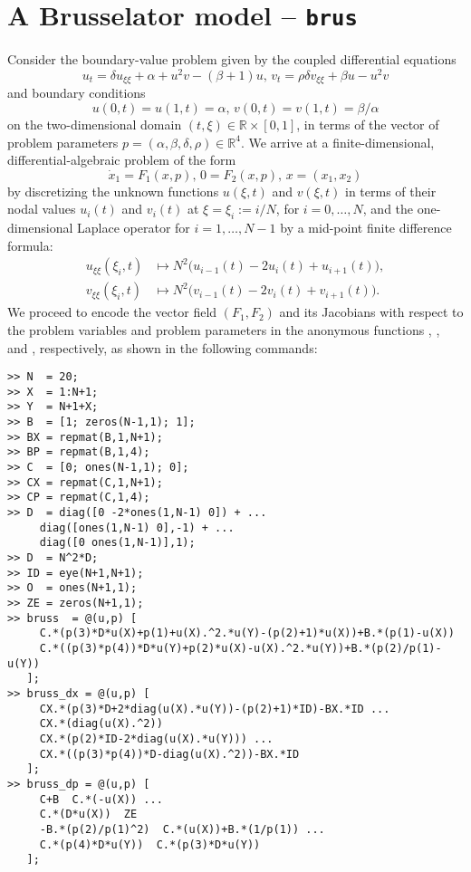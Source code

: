 \section{A Brusselator model -- \texttt{brus}}
Consider the boundary-value problem given by the coupled differential equations
\begin{equation}
u_t= \delta u_{\xi\xi} + \alpha + u^2v - (\beta + 1)u,\,
v_t= \rho\delta v_{\xi\xi} + \beta u - u^2v
\end{equation}
and boundary conditions
\begin{equation}
u(0,t)= u(1,t) = \alpha,\,v(0,t) = v(1,t) = \beta/\alpha
\end{equation}
on the two-dimensional domain $(t,\xi)\in\mathbb{R}\times[0,1]$, in terms of the vector of problem parameters $p=(\alpha,\beta,\delta,\rho)\in\mathbb{R}^4$. We arrive at a finite-dimensional, differential-algebraic problem of the form
\begin{equation}
\dot{x}_1=F_1(x,p),\,0=F_2(x,p),\,x=(x_1,x_2)
\end{equation}
by discretizing the unknown functions $u(\xi,t)$ and $v(\xi,t)$ in terms of their nodal values $u_i(t)$ and $v_i(t)$ at $\xi=\xi_i:=i/N$, for $i=0,\ldots,N$, and the one-dimensional Laplace operator for $i=1,\ldots,N-1$ by a mid-point finite difference formula:
\begin{align}
u_{\xi\xi}(\xi_i,t)&\mapsto N^2\big(u_{i-1}(t)-2u_i(t)+u_{i+1}(t)\big),\\
v_{\xi\xi}(\xi_i,t)&\mapsto N^2\big(v_{i-1}(t)-2v_i(t)+v_{i+1}(t)\big).
\end{align}
We proceed to encode the vector field $(F_1,F_2)$ and its Jacobians with respect to the problem variables and problem parameters in the anonymous functions , , and , respectively, as shown in the following commands:
\begin{lstlisting}[language=coco-highlight]
>> N  = 20;
>> X  = 1:N+1;
>> Y  = N+1+X;
>> B  = [1; zeros(N-1,1); 1];
>> BX = repmat(B,1,N+1);
>> BP = repmat(B,1,4);
>> C  = [0; ones(N-1,1); 0];
>> CX = repmat(C,1,N+1);
>> CP = repmat(C,1,4);
>> D  = diag([0 -2*ones(1,N-1) 0]) + ...
     diag([ones(1,N-1) 0],-1) + ...
     diag([0 ones(1,N-1)],1);
>> D  = N^2*D;
>> ID = eye(N+1,N+1);
>> O  = ones(N+1,1);
>> ZE = zeros(N+1,1);
>> bruss  = @(u,p) [
     C.*(p(3)*D*u(X)+p(1)+u(X).^2.*u(Y)-(p(2)+1)*u(X))+B.*(p(1)-u(X))
     C.*((p(3)*p(4))*D*u(Y)+p(2)*u(X)-u(X).^2.*u(Y))+B.*(p(2)/p(1)-u(Y))
   ];
>> bruss_dx = @(u,p) [
     CX.*(p(3)*D+2*diag(u(X).*u(Y))-(p(2)+1)*ID)-BX.*ID ...
     CX.*(diag(u(X).^2))
     CX.*(p(2)*ID-2*diag(u(X).*u(Y))) ...
     CX.*((p(3)*p(4))*D-diag(u(X).^2))-BX.*ID
   ];
>> bruss_dp = @(u,p) [
     C+B  C.*(-u(X)) ...
     C.*(D*u(X))  ZE
     -B.*(p(2)/p(1)^2)  C.*(u(X))+B.*(1/p(1)) ...
     C.*(p(4)*D*u(Y))  C.*(p(3)*D*u(Y))
   ];
\end{lstlisting}

